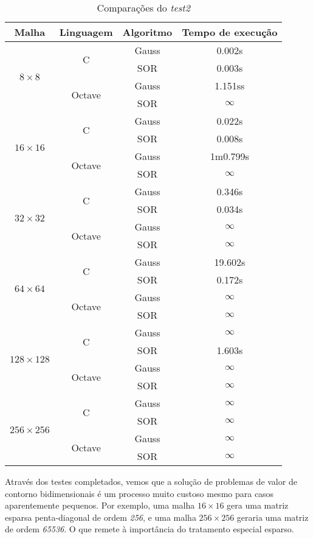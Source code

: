 \documentclass[
	11pt,				%
	oneside,			%
	a4paper,			%
	english,			%
	brazil,				%
	]{article}
\begin{document}
\begin{table}[ht]
\centering
\begin{tabular}{cccc}
\hline 
\textbf{Malha} & \textbf{Linguagem} & \textbf{Algoritmo} & \textbf{Tempo de execução} \\
\hline
\multirow{4}{*}{\textit{$8 \times 8$}} & \multirow{2}{*}{C}  & Gauss & 0.002s  \\ 
& & SOR & 0.003s  \\
& \multirow{2}{*}{Octave} & Gauss & 1.151ss  \\
& & SOR & $\infty$ \\
\hline
\multirow{4}{*}{\textit{$16 \times 16$}} & \multirow{2}{*}{C} & Gauss & 0.022s  \\ 
& & SOR & 0.008s  \\
& \multirow{2}{*}{Octave} & Gauss & 1m0.799s  \\
& & SOR & $\infty$ \\
\hline
\multirow{4}{*}{\textit{$32 \times 32$}} & \multirow{2}{*}{C} & Gauss & 0.346s  \\ 
& & SOR & 0.034s  \\
& \multirow{2}{*}{Octave} & Gauss & $\infty$  \\
& & SOR & $\infty$ \\
\hline
\multirow{4}{*}{\textit{$64 \times 64$}} & \multirow{2}{*}{C} & Gauss & 19.602s  \\ 
& & SOR & 0.172s  \\
& \multirow{2}{*}{Octave} & Gauss & $\infty$  \\
& & SOR & $\infty$ \\
\hline
\multirow{4}{*}{\textit{$128 \times 128$}} & \multirow{2}{*}{C} & Gauss & $\infty$  \\ 
& & SOR & 1.603s  \\
& \multirow{2}{*}{Octave} & Gauss & $\infty$  \\
& & SOR & $\infty$ \\
\hline
\multirow{4}{*}{\textit{$256 \times 256$}} & \multirow{2}{*}{C} & Gauss & $\infty$  \\ 
& & SOR & $\infty$  \\
& \multirow{2}{*}{Octave} & Gauss & $\infty$  \\
& & SOR & $\infty$ \\
\hline
\end{tabular}
\caption{Comparações do \textit{test2}}
\label{tab:cmp2}
\end{table}

Através dos testes completados, vemos que a solução de problemas de valor de contorno bidimensionais é um processo muito custoso mesmo para casos aparentemente pequenos. Por exemplo, uma malha $16\times16$ gera uma matriz esparsa penta-diagonal de ordem \textit{256}, e uma malha $256\times256$ geraria uma matriz de ordem \textit{65536}. O que remete à importância do tratamento especial esparso.
\end{document}
